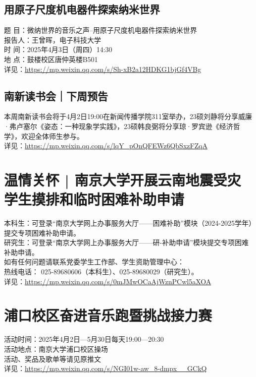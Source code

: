 \documentclass[letterpaper, 12pt]{article}
\begin{document}
\begin{multicols}{2}
\subsection{用原子尺度机电器件探索纳米世界}
题   目：微纳世界的音乐之声–用原子尺度机电器件探索纳米世界
\\报告人：王曾晖，电子科技大学
\\时   间：2025年4月3日（周四）14:30
\\地   点：鼓楼校区唐仲英楼B501
\\详见：\url{https://mp.weixin.qq.com/s/Sh-xB2a12HDKG1bjGf4VBg}


\subsection{南新读书会｜下周预告}
本周南新读书会将于4月2日19:00在新闻传播学院311室举办，23硕刘静将分享威廉·弗卢塞尔《姿态：一种现象学实践》，23硕韩良弼将分享琼·罗宾逊《经济哲学》，欢迎全体师生参与。
\\详见：\url{https://mp.weixin.qq.com/s/lqY_pOnQFEWz6QbSxzFZqA}
\section{温情关怀 | 南京大学开展云南地震受灾学生摸排和临时困难补助申请}
本科生：可登录“南京大学网上办事服务大厅——困难补助”模块（2024-2025学年）提交专项困难补助申请。
\\研究生：可登录“南京大学网上办事服务大厅——研-补助申请”模块提交专项困难补助申请。
\\如有任何问题请联系党委学生工作部、学生资助管理中心：
\\热线电话： 025-89680606（本科生）、025-89680029（研究生）。
\\详见：\url{https://mp.weixin.qq.com/s/0mJMwOCaAjWznPCwl5aXOA}

\section{浦口校区奋进音乐跑暨挑战接力赛}
活动时间：2025年4月2日—5月30日每天19:00—20:30
\\活动地点：南京大学浦口校区操场
\\活动、奖品及歌单等请见原推文
\\详见：\url{https://mp.weixin.qq.com/s/NGI01w-aw_8-dmpx__GCkQ}


\end{multicols}
\end{document}
